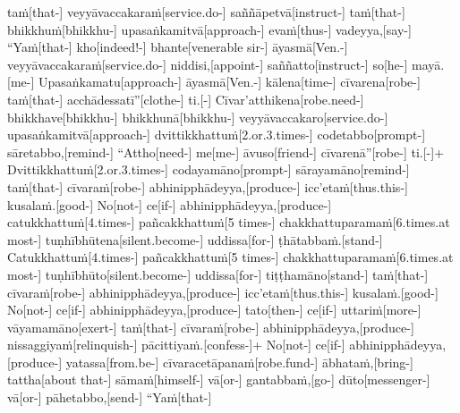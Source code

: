 \documentclass[12pt]{article}
\begin{document}
\begin{paracol}{2}
\begin{column}
\begin{flushleft}
taṁ[that-] veyyāvaccakaraṁ[service.do-] saññāpetvā[instruct-] taṁ[that-] bhikkhuṁ[bhikkhu-] upasaṅkamitvā[approach-] evaṁ[thus-] vadeyya,[say-] “Yaṁ[that-] kho[indeed!-] bhante[venerable sir-] āyasmā[Ven.-] veyyāvaccakaraṁ[service.do-] niddisi,[appoint-] saññatto[instruct-] so[he-] mayā.[me-] Upasaṅkamatu[approach-] āyasmā[Ven.-] kālena[time-] cīvarena[robe-] taṁ[that-] acchādessatī”[clothe-] ti.[-\NUL{\GMU{}}] Cīvar’atthikena[robe.need-] bhikkhave[bhikkhu-] bhikkhunā[bhikkhu-] veyyāvaccakaro[service.do-] upasaṅkamitvā[approach-] dvittikkhattuṁ[2.or.3.times-] codetabbo[prompt-] sāretabbo,[remind-] “Attho[need-] me[me-] āvuso[friend-] cīvarenā”[robe-] ti.[-\NUL{\GMU{}}]+ Dvittikkhattuṁ[2.or.3.times-] codayamāno[prompt-] sārayamāno[remind-] taṁ[that-] cīvaraṁ[robe-] abhinipphādeyya,[produce-] icc’etaṁ[thus.this-] kusalaṁ.[good-] No[not-] ce[if-\NUL{\GMU{}}] abhinipphādeyya,[produce-] catukkhattuṁ[4.times-] pañcakkhattuṁ[5 times-] chakkhattuparamaṁ[6.times.at most-\NUL{\GMU{}}] tuṇhībhūtena[silent.become-] uddissa[for-] ṭhātabbaṁ.[stand-] Catukkhattuṁ[4.times-] pañcakkhattuṁ[5 times-] chakkhattuparamaṁ[6.times.at most-\NUL{\GMU{}}] tuṇhībhūto[silent.become-] uddissa[for-] tiṭṭhamāno[stand-] taṁ[that-] cīvaraṁ[robe-] abhinipphādeyya,[produce-] icc’etaṁ[thus.this-] kusalaṁ.[good-] No[not-] ce[if-\NUL{\GMU{}}] abhinipphādeyya,[produce-] tato[then-] ce[if-\NUL{\GMU{}}] uttariṁ[more-] vāyamamāno[exert-\NUL{\GMU{}}] taṁ[that-] cīvaraṁ[robe-] abhinipphādeyya,[produce-] nissaggiyaṁ[relinquish-] pācittiyaṁ.[confess-]+ No[not-] ce[if-\NUL{\GMU{}}] abhinipphādeyya,[produce-] yatassa[from.be-\NUL{\GMU{}}] cīvaracetāpanaṁ[robe.fund-] ābhataṁ,[bring-] tattha[about that-] sāmaṁ[himself-] vā[or-] gantabbaṁ,[go-] dūto[messenger-] vā[or-] pāhetabbo,[send-] “Yaṁ[that-] 
\end{flushleft}
\end{column}
\end{paracol}
\end{document}
